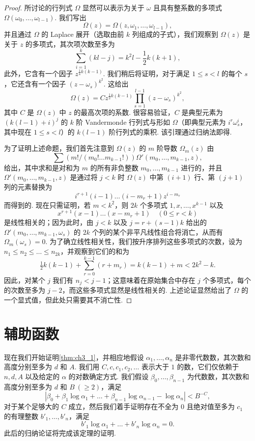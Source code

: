 \begin{proof}
所讨论的行列式 $\Omega$ 显然可以表示为关于 $\omega$ 且具有整系数的多项式 $\Omega(\omega_0, \dots, \omega_{l-1})$. 我们写出
\[
\Omega(z) = \Omega(z, \omega_1, \dots, \omega_{l-1}),
\]
并且通过 $\Omega$ 的 Laplace 展开（选取由前 $k$ 列组成的子式），我们观察到 $\Omega(z)$ 是关于 $z$ 的多项式，其次项次数至多为
\[
\sum_{i=1}^k (kl - j) = k^2 l - \frac{1}{2} k(k+1),
\]
此外，它含有一个因子 $z^{\frac{1}{4}k(k-1)}$. 我们稍后将证明，对于满足 $1 \le s < l$ 的每个 $s$，它还含有一个因子 $(z-\omega_s)^{k^2}$. 这给出
\[
\Omega(z) = C z^{\frac{1}{2}k(k-1)} \prod_{s=1}^{l-1} (z - \omega_s)^{k^2},
\]
其中 $C$ 是 $\Omega(z)$ 中 $z$ 的最高次项的系数. 很容易验证，$C$ 是典型元素为 $(k(l-1)+i)^j$ 的 $k$ 阶 Vandermonde 行列式与形如 $\Omega$（即典型元素为 $i^r\omega_s^i$，其中现在 $1 \le s < l$）的 $k(l-1)$ 阶行列式的乘积. 该引理通过归纳法即得.

为了证明上述命题，我们首先注意到 $\Omega(z)$ 的 $m$ 阶导数 $\Omega_m(z)$ 由
\[
\sum (m!/(m_0! \dots m_{k-1}!))\Omega'(m_0, \dots, m_{k-1}, z),
\]
给出，其中求和是对和为 $m$ 的所有非负整数 $m_0, \dots, m_{k-1}$ 进行的，并且 $\Omega'(m_0, \dots, m_{k-1}, z)$ 是通过将 $j < k$ 时 $\Omega(z)$ 中第 $(i+1)$ 行、第 $(j+1)$ 列的元素替换为
\[
i^{r+1}(i-1)\dots(i-m_r+1)z^{i-m_r}
\]
而得到的. 现在只需证明，若 $m < k^2$，则 $2k$ 个多项式 $1, x, \dots, x^{k-1}$ 以及
\[
x^{r+1}(x-1)\dots(x-m_r+1) \quad (0 \le r < k)
\]
是线性相关的；因为此时，由 $j < k$ 以及 $j = r + (s-1)k$ 给出的 $\Omega'(m_0, \dots, m_{k-1}, \omega_s)$ 的 $2k$ 个列的某个非平凡线性组合将消亡，从而有 $\Omega_m(\omega_s) = 0$. 为了确立线性相关性，我们按升序排列这些多项式的次数，设为 $n_1 \le n_2 \le \dots \le n_{2k}$，并观察到它们的和为
\[
\tfrac{1}{2}k(k-1) + \sum_{r=0}^{k-1} (r+m_r) = k(k-1) + m < 2k^2 - k.
\]
因此，对某个 $j$ 我们有 $n_j < j-1$；这意味着在原始集合中存在 $j$ 个多项式，每个的次数至多为 $j-2$，而这些多项式显然是线性相关的. 上述论证显然给出了 $\Omega$ 的一个显式值，但此处只需要其不消亡性.
\end{proof}

\section{辅助函数}\label{sec:ch3_3}

现在我们开始证明\autoref{thm:ch3_1}，并相应地假设 $\alpha_1, \dots, \alpha_n$ 是非零代数数，其次数和高度分别至多为 $d$ 和 $A$. 我们用 $C, c, c_1, c_2, \dots$ 表示大于 $1$ 的数，它们仅依赖于 $n, d, A$ 以及给定的 $\alpha$ 的对数确定方式. 我们假设 $\beta_0, \dots, \beta_{n-1}$ 为代数数，其次数和高度分别至多为 $d$ 和 $B \ (\ge 2)$，满足
\begin{equation} \label{eq:ch3_1}\tag{1}
|\beta_0 + \beta_1 \log \alpha_1 + \dots + \beta_{n-1} \log \alpha_{n-1} - \log \alpha_n| < B^{-C},
\end{equation}
对于某个足够大的 $C$ 成立，然后我们着手证明存在不全为 $0$ 且绝对值至多为 $c_1$ 的有理整数 $b'_1, \dots, b'_n$，满足
\begin{equation} \label{eq:ch3_2}\tag{2}
b'_1 \log \alpha_1 + \dots + b'_n \log \alpha_n = 0.
\end{equation}
此后的归纳论证将完成该定理的证明.

